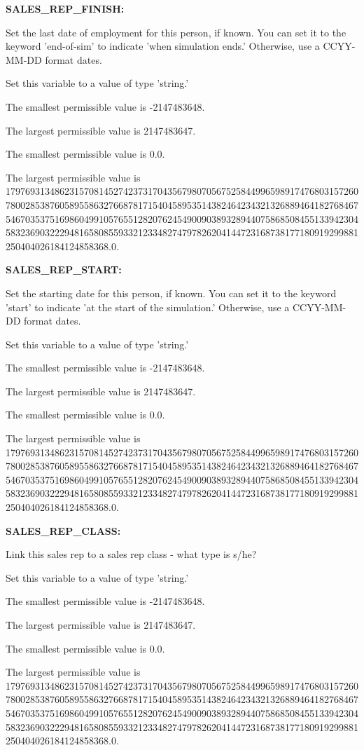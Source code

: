 \textbf{SALES\_REP\_FINISH:}


Set the last date of employment for this person, if known.  You can set it to the keyword 'end-of-sim' to indicate 'when simulation ends.'  Otherwise, use a CCYY-MM-DD format dates.

Set this variable to a value of type 'string.'

The smallest permissible value is -2147483648.

The largest permissible value is 2147483647.

The smallest permissible value is 0.0.

The largest permissible value is 179769313486231570814527423731704356798070567525844996598917476803157260780028538760589558632766878171540458953514382464234321326889464182768467546703537516986049910576551282076245490090389328944075868508455133942304583236903222948165808559332123348274797826204144723168738177180919299881250404026184124858368.0.


\textbf{SALES\_REP\_START:}


Set the starting date for this person, if known.  You can set it to the keyword 'start' to indicate 'at the start of the simulation.'  Otherwise, use a CCYY-MM-DD format dates.

Set this variable to a value of type 'string.'

The smallest permissible value is -2147483648.

The largest permissible value is 2147483647.

The smallest permissible value is 0.0.

The largest permissible value is 179769313486231570814527423731704356798070567525844996598917476803157260780028538760589558632766878171540458953514382464234321326889464182768467546703537516986049910576551282076245490090389328944075868508455133942304583236903222948165808559332123348274797826204144723168738177180919299881250404026184124858368.0.


\textbf{SALES\_REP\_CLASS:}


Link this sales rep to a sales rep class - what type is s/he?

Set this variable to a value of type 'string.'

The smallest permissible value is -2147483648.

The largest permissible value is 2147483647.

The smallest permissible value is 0.0.

The largest permissible value is 179769313486231570814527423731704356798070567525844996598917476803157260780028538760589558632766878171540458953514382464234321326889464182768467546703537516986049910576551282076245490090389328944075868508455133942304583236903222948165808559332123348274797826204144723168738177180919299881250404026184124858368.0.

